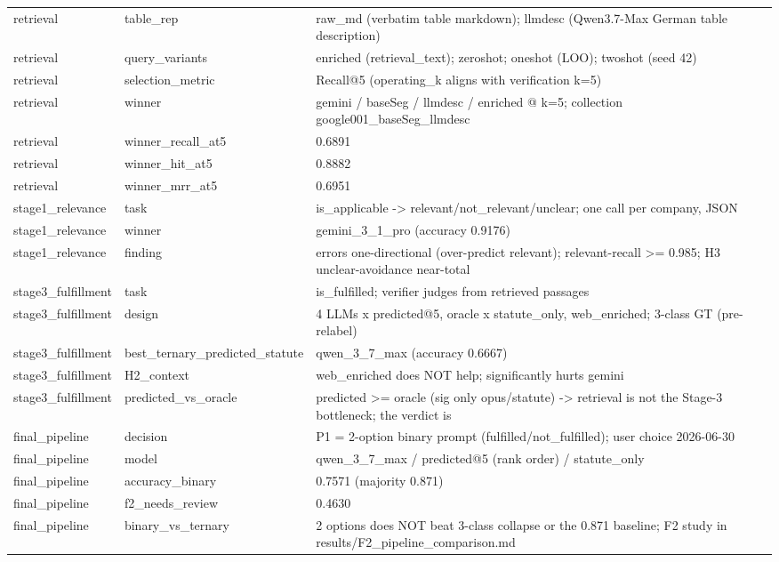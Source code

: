 \begin{table}[htbp]
\begin{tabular}{lll}
    retrieval & table\_rep & raw\_md (verbatim table markdown); llmdesc (Qwen3.7-Max German table description) \\
    retrieval & query\_variants & enriched (retrieval\_text); zeroshot; oneshot (LOO); twoshot (seed 42) \\
    retrieval & selection\_metric & Recall@5 (operating\_k aligns with verification k=5) \\
    retrieval & winner & gemini / baseSeg / llmdesc / enriched @ k=5; collection google001\_baseSeg\_llmdesc \\
    retrieval & winner\_recall\_at5 & 0.6891 \\
    retrieval & winner\_hit\_at5 & 0.8882 \\
    retrieval & winner\_mrr\_at5 & 0.6951 \\
    stage1\_relevance & task & is\_applicable -> relevant/not\_relevant/unclear; one call per company, JSON \\
    stage1\_relevance & winner & gemini\_3\_1\_pro (accuracy 0.9176) \\
    stage1\_relevance & finding & errors one-directional (over-predict relevant); relevant-recall >= 0.985; H3 unclear-avoidance near-total \\
    stage3\_fulfillment & task & is\_fulfilled; verifier judges from retrieved passages \\
    stage3\_fulfillment & design & 4 LLMs x {predicted@5, oracle} x {statute\_only, web\_enriched}; 3-class GT (pre-relabel) \\
    stage3\_fulfillment & best\_ternary\_predicted\_statute & qwen\_3\_7\_max (accuracy 0.6667) \\
    stage3\_fulfillment & H2\_context & web\_enriched does NOT help; significantly hurts gemini \\
    stage3\_fulfillment & predicted\_vs\_oracle & predicted >= oracle (sig only opus/statute) -> retrieval is not the Stage-3 bottleneck; the verdict is \\
    final\_pipeline & decision & P1 = 2-option binary prompt (fulfilled/not\_fulfilled); user choice 2026-06-30 \\
    final\_pipeline & model & qwen\_3\_7\_max / predicted@5 (rank order) / statute\_only \\
    final\_pipeline & accuracy\_binary & 0.7571 (majority 0.871) \\
    final\_pipeline & f2\_needs\_review & 0.4630 \\
    final\_pipeline & binary\_vs\_ternary & 2 options does NOT beat 3-class collapse or the 0.871 baseline; F2 study in results/F2\_pipeline\_comparison.md \\

\end{tabular}
\end{table}
